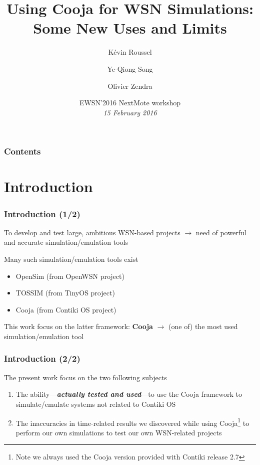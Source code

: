 \documentclass[10pt,c]{beamer}
\title{Using Cooja for WSN Simulations: Some New Uses and Limits}
\author{Kévin Roussel \and Ye-Qiong Song \and Olivier Zendra}
\institute{INRIA Nancy Grand-Est~---
           LORIA UMR~7503~--- Université de Lorraine}
\date{EWSN'2016 NextMote workshop\\
      \textit{15 February 2016}}
\renewcommand{\emph}[1]{\textbf{\textit{#1}}}
\newcommand{\nom}[1]{\textbf{#1}}
\begin{document}
\begin{frame}
\titlepage
\end{frame}


\begin{frame}
\frametitle{Contents}
\tableofcontents
\end{frame}


\section{Introduction}

\begin{frame}
\frametitle{Introduction (1/2)}
\begin{block}{To develop and test large, ambitious WSN-based projects}
$\rightarrow$ need of powerful and accurate simulation/emulation tools
\end{block}
\begin{block}{Many such simulation/emulation tools exist}
\begin{itemize}
\item OpenSim (from OpenWSN project)
\item TOSSIM (from TinyOS project)
\item Cooja (from Contiki OS project)
\end{itemize}
\end{block}
\begin{exampleblock}{This work focus on the latter framework: \nom{Cooja}}
$\rightarrow$ (one of) the most used simulation/emulation tool
\end{exampleblock}
\end{frame}

\begin{frame}
\frametitle{Introduction (2/2)}
\begin{block}{The present work focus on the two following subjects}
\begin{enumerate}
\item The ability---\emph{actually tested and used}---to use the Cooja
framework to simulate/emulate systems not related to Contiki OS
\item The inaccuracies in time-related results we discovered while using
Cooja\footnote{Note we always used the Cooja version provided with
Contiki release 2.7} to perform our own simulations to test our own
WSN-related projects
\end{enumerate}
\end{block}
\end{frame}
\end{document}
